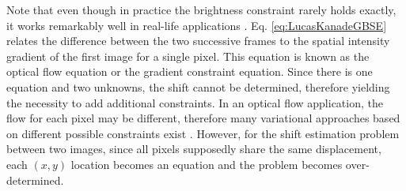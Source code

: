 Note that even though in practice  the brightness constraint rarely holds exactly, it works remarkably well in real-life applications \cite{Fleet05opticalflow}. Eq. \eqref{eq:LucasKanadeGBSE} relates the difference between the two successive frames to the spatial intensity gradient of the first image for a single pixel. This equation is known as the optical flow equation or the gradient constraint equation. Since there is one equation and two unknowns, the shift cannot be determined, therefore yielding the necessity to add additional constraints. In an optical flow application, the flow for each pixel may be different, therefore many variational approaches based on different possible constraints exist \cite{Weickert2006,beauchemin1995computation,Chao2014}. However, for the shift estimation problem between two images, since all pixels supposedly share the same displacement, each $(x,y)$ location becomes an equation and the problem becomes over-determined. 


